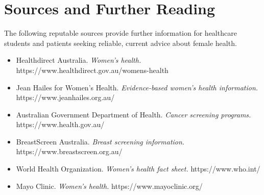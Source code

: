 \section*{Sources and Further Reading}
The following reputable sources provide further information for healthcare students and patients seeking reliable, current advice about female health.
\begin{itemize}
    \item Healthdirect Australia. \textit{Women's health.} https://www.healthdirect.gov.au/womens-health
    \item Jean Hailes for Women's Health. \textit{Evidence-based women's health information.} https://www.jeanhailes.org.au/
    \item Australian Government Department of Health. \textit{Cancer screening programs.} https://www.health.gov.au/
    \item BreastScreen Australia. \textit{Breast screening information.} https://www.breastscreen.org.au/
    \item World Health Organization. \textit{Women's health fact sheet.} https://www.who.int/
    \item Mayo Clinic. \textit{Women's health.} https://www.mayoclinic.org/
\end{itemize}
